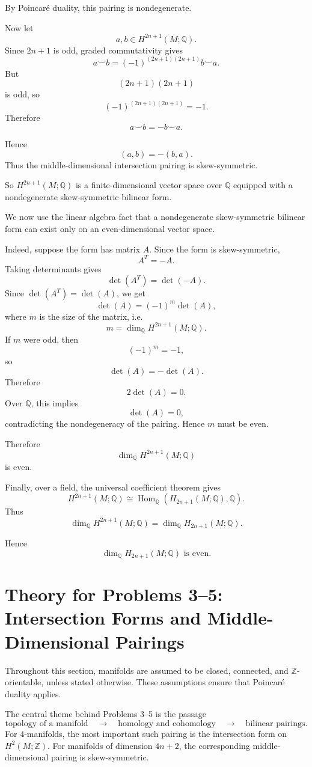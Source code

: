 \documentclass[12pt,a4paper]{article}
\theoremstyle{notespace}
\begin{document}
By Poincaré duality, this pairing is nondegenerate.

Now let
\[
a,b\in H^{2n+1}(M;\mathbb Q).
\]
Since \(2n+1\) is odd, graded commutativity gives
\[
a\smile b
=
(-1)^{(2n+1)(2n+1)}b\smile a.
\]
But
\[
(2n+1)(2n+1)
\]
is odd, so
\[
(-1)^{(2n+1)(2n+1)}=-1.
\]
Therefore
\[
a\smile b=-b\smile a.
\]

Hence
\[
(a,b)=-(b,a).
\]
Thus the middle-dimensional intersection pairing is skew-symmetric.

So \(H^{2n+1}(M;\mathbb Q)\) is a finite-dimensional vector space over
\(\mathbb Q\) equipped with a nondegenerate skew-symmetric bilinear form.

We now use the linear algebra fact that a nondegenerate skew-symmetric bilinear
form can exist only on an even-dimensional vector space.

Indeed, suppose the form has matrix \(A\). Since the form is skew-symmetric,
\[
A^T=-A.
\]
Taking determinants gives
\[
\det(A^T)=\det(-A).
\]
Since \(\det(A^T)=\det(A)\), we get
\[
\det(A)=(-1)^m\det(A),
\]
where \(m\) is the size of the matrix, i.e.
\[
m=\dim_{\mathbb Q}H^{2n+1}(M;\mathbb Q).
\]
If \(m\) were odd, then
\[
(-1)^m=-1,
\]
so
\[
\det(A)=-\det(A).
\]
Therefore
\[
2\det(A)=0.
\]
Over \(\mathbb Q\), this implies
\[
\det(A)=0,
\]
contradicting the nondegeneracy of the pairing. Hence \(m\) must be even.

Therefore
\[
\dim_{\mathbb Q}H^{2n+1}(M;\mathbb Q)
\]
is even.

Finally, over a field, the universal coefficient theorem gives
\[
H^{2n+1}(M;\mathbb Q)
\cong
\operatorname{Hom}_{\mathbb Q}(H_{2n+1}(M;\mathbb Q),\mathbb Q).
\]
Thus
\[
\dim_{\mathbb Q}H^{2n+1}(M;\mathbb Q)
=
\dim_{\mathbb Q}H_{2n+1}(M;\mathbb Q).
\]

Hence
\[
\boxed{
	\dim_{\mathbb Q}H_{2n+1}(M;\mathbb Q)
	\text{ is even.}
}
\]	
	
\section{Theory for Problems 3--5: Intersection Forms and Middle-Dimensional Pairings}

Throughout this section, manifolds are assumed to be closed, connected, and
\(\mathbb Z\)-orientable, unless stated otherwise. These assumptions ensure that
Poincaré duality applies.

The central theme behind Problems 3--5 is the passage
\[
\text{topology of a manifold}
\quad\longrightarrow\quad
\text{homology and cohomology}
\quad\longrightarrow\quad
\text{bilinear pairings}.
\]
For \(4\)-manifolds, the most important such pairing is the intersection form on
\(H^2(M;\mathbb Z)\). For manifolds of dimension \(4n+2\), the corresponding
middle-dimensional pairing is skew-symmetric.
\end{document}
